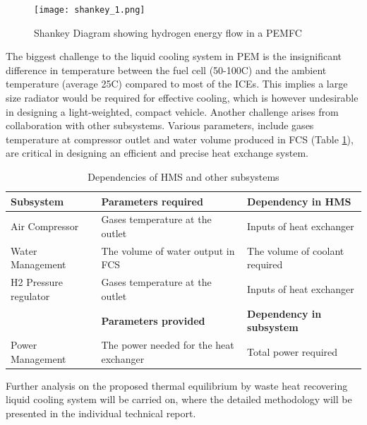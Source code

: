 \documentclass[a4paper,11pt]{article}
\begin{document}
\begin{figure}[h]
    \texttt{[image: shankey\_1.png]}
    \centering  
    \caption{Shankey Diagram showing hydrogen energy flow in a PEMFC\cite{nguyen2020proton}}
    \centering
    \label{fig:sangkyEnergy}  
\end{figure}

The biggest challenge to the liquid cooling system in PEM is the insignificant difference in temperature between the fuel cell (50-100\degree C) and the ambient temperature (average 25\degree C) compared to most of the ICEs\cite{islamnanofluid}. This implies a large size radiator would be required for effective cooling, which is however undesirable in designing a light-weighted, compact vehicle. Another challenge arises from collaboration with other subsystems. Various parameters, include gases temperature at compressor outlet and water volume produced in FCS (Table \ref{tab:subsystemDependencies}), are critical in designing an efficient and precise heat exchange system.

\begin{table}[h!]
    \centering
    \begin{tabular}{|p{}|p{}||p{}|}%
    \hline
    \textbf{Subsystem} & \textbf{Parameters required} & \textbf{Dependency in HMS} \\ [0.5ex] 
    \hline\hline
    Air Compressor & Gases temperature at the outlet & Inputs of heat exchanger \\
    \hline
    Water Management & The volume of water output in FCS & The volume of coolant required \\
    \hline
    H2 Pressure regulator & Gases temperature at the outlet & Inputs of heat exchanger \\
    \hline
    & \textbf{Parameters provided} & \textbf{Dependency in subsystem} \\
    \hline
    Power Management & The power needed for the heat exchanger & Total power required \\
    \hline
    \end{tabular}
    \caption{Dependencies of HMS and other subsystems\cite{pukrushpan2004control}}
    \label{tab:subsystemDependencies}
\end{table}

Further analysis on the proposed thermal equilibrium by waste heat recovering liquid cooling system will be carried on, where the detailed methodology will be presented in the individual technical report.
\end{document}
